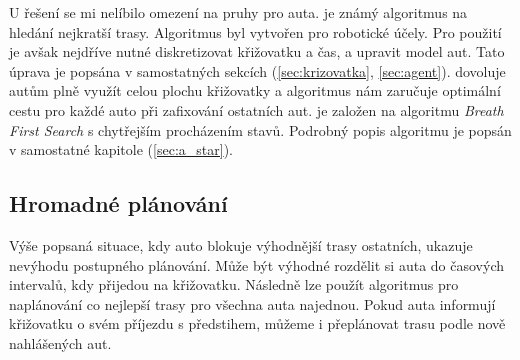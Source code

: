 U řešení \citet{Dresner} se mi nelíbilo omezení na pruhy pro auta.
 je známý algoritmus na hledání nejkratší trasy.
Algoritmus byl vytvořen \citet*{Hart1968} pro robotické účely.
Pro použití  je avšak nejdříve nutné diskretizovat křižovatku a čas, a upravit model aut.
Tato úprava je popsána v samostatných sekcích (\ref{sec:krizovatka}, \ref{sec:agent}).
 dovoluje autům plně využít celou plochu křižovatky a algoritmus nám zaručuje optimální cestu pro každé auto při zafixování ostatních aut.
 je založen na algoritmu \emph{Breath First Search} s chytřejším procházením stavů.
Podrobný popis algoritmu je popsán v samostatné kapitole (\ref{sec:a_star}).

%
\subsection{Hromadné plánování}\label{subsec:hromadne_planovani}


Výše popsaná situace, kdy auto blokuje výhodnější trasy ostatních, ukazuje nevýhodu postupného plánování.
Může být výhodné rozdělit si auta do časových intervalů, kdy přijedou na křižovatku.
Následně lze použít algoritmus pro naplánování co nejlepší trasy pro všechna auta najednou.
Pokud auta informují křižovatku o svém příjezdu s předstihem, můžeme i přeplánovat trasu podle nově nahlášených aut.

%
%
%


